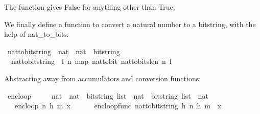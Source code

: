 \begin{isabellebody}
\begin{isamarkuptext}%
The function gives False for anything other than True.%
\end{isamarkuptext}\isamarkuptrue%
%
\begin{isamarkuptext}%
We finally define a function to convert a natural number to a bitstring, with the help of 
nat_to_bits.%
\end{isamarkuptext}\isamarkuptrue%
\isamarkupfalse%
\ nat{\isacharunderscore}{\kern0pt}to{\isacharunderscore}{\kern0pt}bitstring\ {\isacharcolon}{\kern0pt}{\isacharcolon}{\kern0pt}\ {\isachardoublequoteopen}nat\ {\isasymRightarrow}\ nat\ {\isasymRightarrow}\ bitstring{\isachardoublequoteclose}\ \ \isanewline
\ \ {\isachardoublequoteopen}nat{\isacharunderscore}{\kern0pt}to{\isacharunderscore}{\kern0pt}bitstring\ {\isacharequal}{\kern0pt}\ {\isacharparenleft}{\kern0pt}{\isasymlambda}l\ n{\isachardot}{\kern0pt}\ map\ {\isacharparenleft}{\kern0pt}nat{\isacharunderscore}{\kern0pt}to{\isacharunderscore}{\kern0pt}bit{\isacharparenright}{\kern0pt}\ {\isacharparenleft}{\kern0pt}nat{\isacharunderscore}{\kern0pt}to{\isacharunderscore}{\kern0pt}bits{\isacharunderscore}{\kern0pt}len\ n\ l{\isacharparenright}{\kern0pt}{\isacharparenright}{\kern0pt}{\isachardoublequoteclose}%
\begin{isamarkuptext}%
Abstracting away from accumulators and conversion functions:%
\end{isamarkuptext}\isamarkuptrue%
\isamarkupfalse%
\ enc{\isacharunderscore}{\kern0pt}loop\ \isanewline
\ \ \ {\isacharcolon}{\kern0pt}{\isacharcolon}{\kern0pt}\ {\isachardoublequoteopen}{\isacharparenleft}{\kern0pt}nat\ {\isasymtimes}\ nat\ {\isasymtimes}\ bitstring\ list{\isacharparenright}{\kern0pt}\ {\isasymRightarrow}\ nat\ {\isasymRightarrow}\ {\isacharparenleft}{\kern0pt}bitstring\ list\ {\isasymtimes}\ nat{\isacharparenright}{\kern0pt}{\isachardoublequoteclose}\ \isanewline
\ \ \ \isanewline
\ \ \ {\isachardoublequoteopen}enc{\isacharunderscore}{\kern0pt}loop\ {\isacharparenleft}{\kern0pt}n{\isacharcomma}{\kern0pt}\ h{\isacharcomma}{\kern0pt}\ m{\isacharparenright}{\kern0pt}\ x\ \isanewline
\ \ \ \ {\isacharequal}{\kern0pt}\ enc{\isacharunderscore}{\kern0pt}loop{\isacharunderscore}{\kern0pt}func\ {\isacharparenleft}{\kern0pt}nat{\isacharunderscore}{\kern0pt}to{\isacharunderscore}{\kern0pt}bitstring\ h{\isacharcomma}{\kern0pt}\ n{\isacharcomma}{\kern0pt}\ h{\isacharcomma}{\kern0pt}\ m{\isacharparenright}{\kern0pt}\ {\isacharbrackleft}{\kern0pt}{\isacharbrackright}{\kern0pt}\ x{\isachardoublequoteclose}\isanewline

\end{isabellebody}
